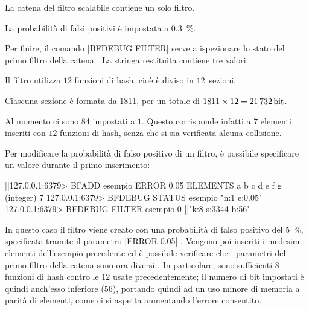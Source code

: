 \begin{description}[labelindent=2\parindent,leftmargin=!,labelwidth=6em,font={\bfseries\ttfamily}]
  \item[n = 1] La catena del filtro scalabile contiene un solo filtro.
  \item[e = 0.003] La probabilità di falsi positivi è impostata a \SI{0.3}{\percent}.
\end{description}

Per finire, il comando \cverb|BFDEBUG FILTER| serve a ispezionare lo stato del primo filtro della
catena . La stringa restituita contiene tre valori:

\begin{description}[labelindent=2\parindent,leftmargin=!,labelwidth=6em,font={\bfseries\ttfamily}]
  \item[k = 12] Il filtro utilizza $12$ funzioni di hash, cioè è diviso in $12$~sezioni.
  \item[s = 1811] Ciascuna sezione è formata da \SI{1811}{\bit}, per un totale di 
      $\num{1811} \times \num{12} = \SI{21732}{\bit}$.
  \item[b = 84] Al momento ci sono \SI{84}{\bit} impostati a $1$. Questo corrisponde infatti a $7$
  elementi inseriti con $12$ funzioni di hash, senza che si sia verificata alcuna collisione.
\end{description}

Per modificare la probabilità di falso positivo di un filtro, è possibile specificare un valore
durante il primo inserimento:

\medskip
\begin{commentedsource}[style=redis,caption=Filtro con probabilità configurata dall'utente]
|\lnote|127.0.0.1:6379> BFADD esempio ERROR 0.05 ELEMENTS a b c d e f g
(integer) 7
127.0.0.1:6379> BFDEBUG STATUS esempio
"n:1 e:0.05"
127.0.0.1:6379> BFDEBUG FILTER esempio 0
|\lnote|"k:8 s:3344 b:56"
\end{commentedsource}

In questo caso il filtro viene creato con una probabilità di falso positivo del \SI{5}{\%},
specificata tramite il parametro \cverb|ERROR 0.05| . Vengono poi inseriti i medesimi
elementi dell'esempio precedente ed è possibile verificare che i parametri del primo filtro 
della catena sono ora diversi . In particolare, sono sufficienti $8$ funzioni di hash
contro le $12$ usate precedentemente; il numero di bit impostati è quindi anch'esso inferiore
($56$), portando quindi ad un uso minore di memoria a parità di elementi, come ci si aspetta
aumentando l'errore consentito.

